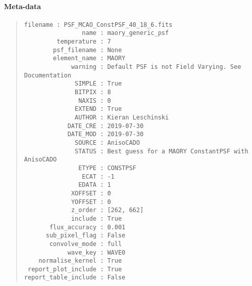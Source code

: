 \begin{figure}[H]
\noindent{}\label{fig-maory-generic-psf}
\end{figure}


\paragraph{Meta-data%
  \label{id2}%
}

\begin{quote}
\begin{alltt}
\begin{lstlisting}[frame=single]
            filename : PSF_MCAO_ConstPSF_40_18_6.fits
                name : maory_generic_psf
         temperature : 7
        psf_filename : None
        element_name : MAORY
             warning : Default PSF is not Field Varying. See Documentation
              SIMPLE : True
              BITPIX : 8
               NAXIS : 0
              EXTEND : True
              AUTHOR : Kieran Leschinski
            DATE_CRE : 2019-07-30
            DATE_MOD : 2019-07-30
              SOURCE : AnisoCADO
              STATUS : Best guess for a MAORY ConstantPSF with AnisoCADO
               ETYPE : CONSTPSF
                ECAT : -1
               EDATA : 1
             XOFFSET : 0
             YOFFSET : 0
             z_order : [262, 662]
             include : True
       flux_accuracy : 0.001
      sub_pixel_flag : False
       convolve_mode : full
            wave_key : WAVE0
    normalise_kernel : True
 report_plot_include : True
report_table_include : False
\end{lstlisting}
\end{alltt}
\end{quote}

